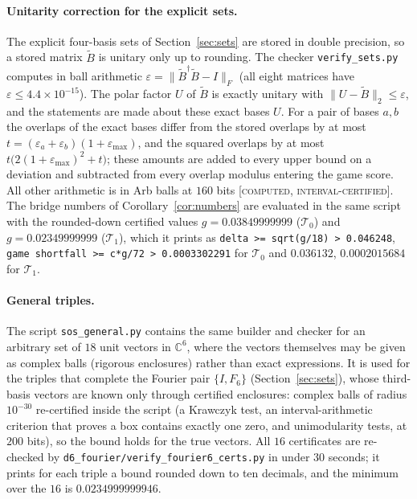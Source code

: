 \documentclass[11pt]{article}
\newcommand{\C}{\mathbb{C}}
\newcommand{\norm}[1]{\lVert #1\rVert}
\newcommand{\Tz}{\mathcal{T}_0}          %
\newcommand{\To}{\mathcal{T}_1}          %
\newcommand{\st}[1]{\textsc{[#1]}}
\newcommand{\stcert}{\st{computed, interval-certified}}
\theoremstyle{definition}
\theoremstyle{remark}
\begin{document}
\paragraph{Unitarity correction for the explicit sets.} The explicit four-basis sets of Section~\ref{sec:sets} are
stored in double precision, so a stored matrix $\tilde B$ is unitary only up to rounding. The checker
\texttt{verify\_sets.py} computes in ball arithmetic $\varepsilon=\norm{\tilde B^{\dagger}\tilde B-I}_F$ (all eight
matrices have $\varepsilon\le4.4\times10^{-15}$). The polar factor $U$ of $\tilde B$ is exactly unitary with
$\norm{U-\tilde B}_2\le\varepsilon$, and the statements are made about these exact bases $U$. For a pair of bases
$a,b$ the overlaps of the exact bases differ from the stored overlaps by at most
$t=(\varepsilon_a+\varepsilon_b)(1+\varepsilon_{\max})$, and the squared overlaps by at most
$t\bigl(2(1+\varepsilon_{\max})^2+t\bigr)$; these amounts are added to every upper bound on a deviation and
subtracted from every overlap modulus entering the game score. All other arithmetic is in Arb balls at $160$ bits
\stcert. The bridge numbers of Corollary~\ref{cor:numbers} are evaluated in the same script with the rounded-down
certified values $g=0.03849999999$ ($\Tz$) and $g=0.02349999999$ ($\To$), which it prints as
\texttt{delta >= sqrt(g/18) > 0.046248}, \texttt{game shortfall >= c*g/72 > 0.0003302291} for $\Tz$ and
$0.036132$, $0.0002015684$ for $\To$.

\paragraph{General triples.} The script \texttt{sos\_general.py} contains the same builder and checker for an
arbitrary set of $18$ unit vectors in $\C^6$, where the vectors themselves may be given as complex balls (rigorous
enclosures) rather than exact expressions. It is used for the triples that complete the Fourier pair $\{I,F_6\}$
(Section~\ref{sec:sets}), whose third-basis vectors are known only through certified enclosures: complex balls of
radius $10^{-30}$ re-certified inside the script (a Krawczyk test, an interval-arithmetic criterion that proves a box contains exactly one zero, and
unimodularity tests, at $200$ bits), so the bound holds
for the true vectors. All $16$ certificates are re-checked by \texttt{d6\_fourier/verify\_fourier6\_certs.py} in
under $30$ seconds; it prints for each triple a bound rounded down to ten decimals, and the minimum over the $16$ is
$0.0234999999946$.
\end{document}
